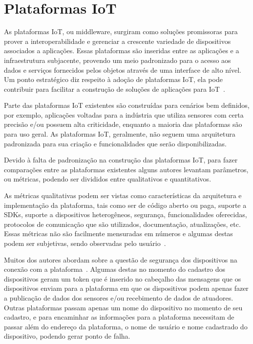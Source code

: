 \documentclass{sbrt}
\begin{document}
\section{Plataformas IoT}
\label{sec:plat}

As plataformas IoT, ou middleware, surgiram como soluções promissoras para prover a interoperabilidade e gerenciar a crescente variedade de dispositivos associados a aplicações. Essas plataformas são inseridas entre as aplicações e a infraestrutura subjacente, provendo um meio padronizado para o acesso aos dados e serviços fornecidos pelos objetos através de uma interface de alto nível. Um ponto estratégico diz respeito à adoção de plataformas IoT, ela pode contribuir para facilitar a construção de soluções de aplicações para IoT~\cite{pires2015}.

Parte das plataformas IoT existentes são construídas para cenários bem definidos, por exemplo, aplicações voltadas para a indústria que utiliza sensores com certa precisão e/ou possuem alta criticidade, enquanto a maioria das plataformas são para uso geral. As plataformas IoT, geralmente, não seguem uma arquitetura padronizada para sua criação e funcionalidades que serão disponibilizadas. 

Devido à falta de padronização na construção das plataformas IoT, para fazer comparações entre as plataformas existentes alguns autores levantam parâmetros, ou métricas, podendo ser divididos entre qualitativos e quantitativos.

As métricas qualitativas podem ser vistas como características da arquitetura e implementação da plataforma, tais como ser de código aberto ou paga, suporte a SDKs, suporte a dispositivos heterogêneos, segurança, funcionalidades oferecidas, protocolos de comunicação que são utilizados, documentação, atualizações, etc. Essas métricas não são facilmente mensuradas em números e algumas destas podem ser subjetivas, sendo observadas pelo usuário~\cite{mineraud2016gap,ganguly2016selecting}.

Muitos dos autores abordam sobre a questão de segurança dos dispositivos na conexão com a plataforma~\cite{da2018performance}. Algumas destas no momento do cadastro dos dispositivos geram um token que é inserido no cabeçalho das mensagens que os dispositivos enviam para a plataforma em que os dispositivos podem apenas fazer a publicação de dados dos sensores e/ou recebimento de dados de atuadores. Outras plataformas passam apenas um nome do dispositivo no momento de seu cadastro, e para encaminhar as informações para a plataforma necessitam de passar além do endereço da plataforma, o nome de usuário e nome cadastrado do dispositivo, podendo gerar ponto de falha.
\end{document}
